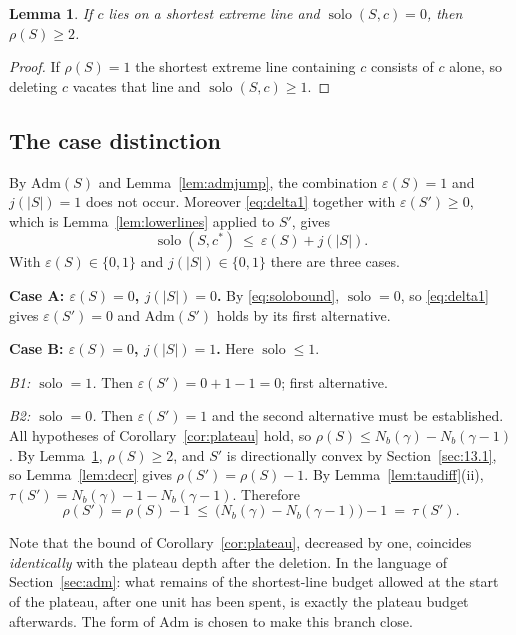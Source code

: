 \documentclass[11pt]{article}
\theoremstyle{plain}
\newtheorem{lemma}[theorem]{Lemma}
\theoremstyle{definition}
\theoremstyle{remark}
\DeclareMathOperator{\solo}{solo}
\newcommand{\Adm}{\mathrm{Adm}}
\begin{document}
\begin{lemma}\label{lem:solo0}
If \(c\) lies on a shortest extreme line and \(\solo(S,c)=0\), then \(\rho(S)\ge2\).
\end{lemma}

\begin{proof}
If \(\rho(S)=1\) the shortest extreme line containing \(c\) consists of \(c\) alone, so
deleting \(c\) vacates that line and \(\solo(S,c)\ge1\).
\end{proof}

\subsection{The case distinction}\label{sec:13.3}

By \(\Adm(S)\) and Lemma~\ref{lem:admjump}, the combination \(\varepsilon(S)=1\) and
\(j(|S|)=1\) does not occur. Moreover \eqref{eq:delta1} together with
\(\varepsilon(S')\ge0\), which is Lemma~\ref{lem:lowerlines} applied to \(S'\), gives
\begin{equation}\label{eq:solobound}
   \solo(S,c^{*})\ \le\ \varepsilon(S)+j(|S|).
\end{equation}
With \(\varepsilon(S)\in\{0,1\}\) and \(j(|S|)\in\{0,1\}\) there are three cases.

\medskip\noindent\textbf{Case A: \(\varepsilon(S)=0\), \(j(|S|)=0\).} By
\eqref{eq:solobound}, \(\solo=0\), so \eqref{eq:delta1} gives \(\varepsilon(S')=0\) and
\(\Adm(S')\) holds by its first alternative.

\medskip\noindent\textbf{Case B: \(\varepsilon(S)=0\), \(j(|S|)=1\).} Here \(\solo\le1\).

\emph{B1: \(\solo=1\).} Then \(\varepsilon(S')=0+1-1=0\); first alternative.

\emph{B2: \(\solo=0\).} Then \(\varepsilon(S')=1\) and the second alternative must be
established. All hypotheses of Corollary~\ref{cor:plateau} hold, so
\(\rho(S)\le N_{b}(\gamma)-N_{b}(\gamma-1)\). By Lemma~\ref{lem:solo0},
\(\rho(S)\ge2\), and \(S'\) is directionally convex by Section~\ref{sec:13.1}, so
Lemma~\ref{lem:decr} gives \(\rho(S')=\rho(S)-1\). By Lemma~\ref{lem:taudiff}(ii),
\(\tau(S')=N_{b}(\gamma)-1-N_{b}(\gamma-1)\). Therefore
\[
   \rho(S')=\rho(S)-1\ \le\ \bigl(N_{b}(\gamma)-N_{b}(\gamma-1)\bigr)-1\ =\ \tau(S') .
\]

Note that the bound of Corollary~\ref{cor:plateau}, decreased by one, coincides
\emph{identically} with the plateau depth after the deletion. In the language of
Section~\ref{sec:adm}: what remains of the shortest-line budget allowed at the start of the
plateau, after one unit has been spent, is exactly the plateau budget afterwards. The form
of \(\Adm\) is chosen to make this branch close.
\end{document}
